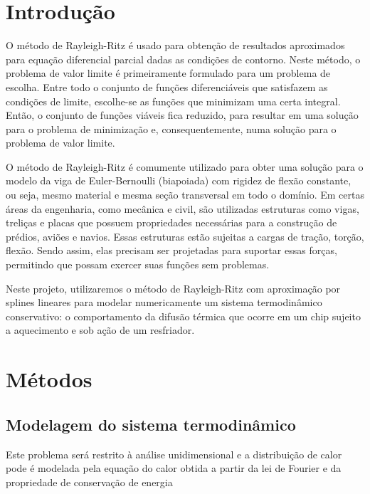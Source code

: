 \documentclass[a4,12pt]{horizon-theme}
\renewcommand{\thefootnote}{\fnsymbol{footnote}}
\begin{document}
\horizonCover

\horizonTitle

\renewcommand{\thefootnote}{\arabic{footnote}}
\hspace{40pt}


\section{Introdução}

O método de Rayleigh-Ritz é usado para obtenção de resultados aproximados para equação diferencial parcial dadas as condições de contorno. Neste método, o problema de valor limite é primeiramente formulado para um problema de escolha. Entre todo o conjunto de funções diferenciáveis que satisfazem as condições de limite, escolhe-se as funções que minimizam uma certa integral. Então, o conjunto de funções viáveis fica reduzido, para resultar em uma solução para o problema de minimização e, consequentemente, numa solução para o problema de valor limite.

O método de Rayleigh-Ritz é comumente utilizado para obter uma solução para o modelo da viga de Euler-Bernoulli (biapoiada) com rigidez de flexão constante, ou seja, mesmo material e mesma seção transversal em todo o domínio. Em certas áreas da engenharia, como mecânica e civil, são utilizadas estruturas como vigas, treliças e placas que possuem propriedades necessárias para a construção de prédios, aviões e navios. Essas estruturas estão sujeitas a cargas de tração, torção, flexão. Sendo assim, elas precisam ser projetadas para suportar essas forças, permitindo que possam exercer suas funções sem problemas.

Neste projeto, utilizaremos o método de Rayleigh-Ritz com aproximação por splines lineares para modelar numericamente um sistema termodinâmico conservativo: o comportamento da difusão térmica que ocorre em um chip sujeito a aquecimento e sob ação de um resfriador.


\newpage
\section{Métodos}
\label{sec:metodo}

\subsection{Modelagem do sistema termodinâmico}
\label{sec:modelagem}

Este problema será restrito à análise unidimensional e a distribuição de calor pode é modelada pela equação do calor obtida a partir da lei de Fourier e da propriedade de conservação de energia
\end{document}

